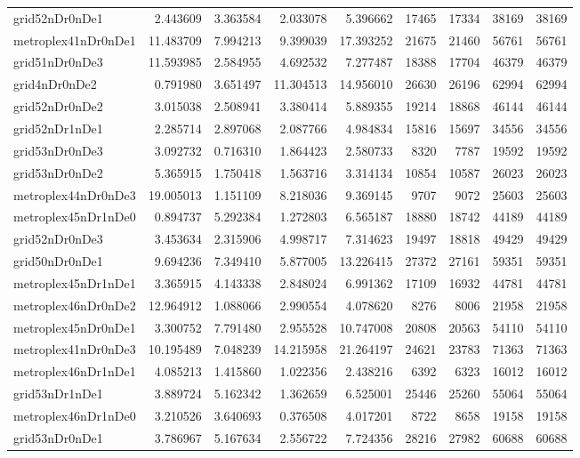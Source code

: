 \begin{longtable}{|l|r|r|r|r|r|r|r|r|}
grid52nDr0nDe1 & 2.443609 & 3.363584 & 2.033078 & 5.396662 & 17465 & 17334 & 38169 & 38169 \\
metroplex41nDr0nDe1 & 11.483709 & 7.994213 & 9.399039 & 17.393252 & 21675 & 21460 & 56761 & 56761 \\
grid51nDr0nDe3 & 11.593985 & 2.584955 & 4.692532 & 7.277487 & 18388 & 17704 & 46379 & 46379 \\
grid4nDr0nDe2 & 0.791980 & 3.651497 & 11.304513 & 14.956010 & 26630 & 26196 & 62994 & 62994 \\
grid52nDr0nDe2 & 3.015038 & 2.508941 & 3.380414 & 5.889355 & 19214 & 18868 & 46144 & 46144 \\
grid52nDr1nDe1 & 2.285714 & 2.897068 & 2.087766 & 4.984834 & 15816 & 15697 & 34556 & 34556 \\
grid53nDr0nDe3 & 3.092732 & 0.716310 & 1.864423 & 2.580733 & 8320 & 7787 & 19592 & 19592 \\
grid53nDr0nDe2 & 5.365915 & 1.750418 & 1.563716 & 3.314134 & 10854 & 10587 & 26023 & 26023 \\
metroplex44nDr0nDe3 & 19.005013 & 1.151109 & 8.218036 & 9.369145 & 9707 & 9072 & 25603 & 25603 \\
metroplex45nDr1nDe0 & 0.894737 & 5.292384 & 1.272803 & 6.565187 & 18880 & 18742 & 44189 & 44189 \\
grid52nDr0nDe3 & 3.453634 & 2.315906 & 4.998717 & 7.314623 & 19497 & 18818 & 49429 & 49429 \\
grid50nDr0nDe1 & 9.694236 & 7.349410 & 5.877005 & 13.226415 & 27372 & 27161 & 59351 & 59351 \\
metroplex45nDr1nDe1 & 3.365915 & 4.143338 & 2.848024 & 6.991362 & 17109 & 16932 & 44781 & 44781 \\
metroplex46nDr0nDe2 & 12.964912 & 1.088066 & 2.990554 & 4.078620 & 8276 & 8006 & 21958 & 21958 \\
metroplex45nDr0nDe1 & 3.300752 & 7.791480 & 2.955528 & 10.747008 & 20808 & 20563 & 54110 & 54110 \\
metroplex41nDr0nDe3 & 10.195489 & 7.048239 & 14.215958 & 21.264197 & 24621 & 23783 & 71363 & 71363 \\
metroplex46nDr1nDe1 & 4.085213 & 1.415860 & 1.022356 & 2.438216 & 6392 & 6323 & 16012 & 16012 \\
grid53nDr1nDe1 & 3.889724 & 5.162342 & 1.362659 & 6.525001 & 25446 & 25260 & 55064 & 55064 \\
metroplex46nDr1nDe0 & 3.210526 & 3.640693 & 0.376508 & 4.017201 & 8722 & 8658 & 19158 & 19158 \\
grid53nDr0nDe1 & 3.786967 & 5.167634 & 2.556722 & 7.724356 & 28216 & 27982 & 60688 & 60688 \\

\end{longtable}
